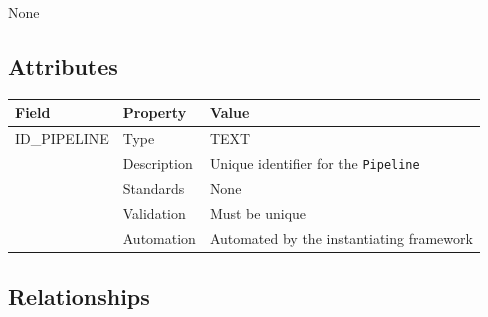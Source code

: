 \documentclass[
]{article}
\newcounter{none} %
\begin{document}
None

\subsection{Attributes}\label{attributes-21}

{\def\LTcaptype{none} %
\begin{longtable}[]{@{}lll@{}}
\toprule\noalign{}
Field & Property & Value \\
\midrule\noalign{}
\endhead
\bottomrule\noalign{}
\endlastfoot
ID\_PIPELINE & Type & TEXT \\
& Description & Unique identifier for the \texttt{Pipeline} \\
& Standards & None \\
& Validation & Must be unique \\
& Automation & Automated by the instantiating framework \\
\end{longtable}
}

\subsection{Relationships}\label{relationships-19}
\end{document}
